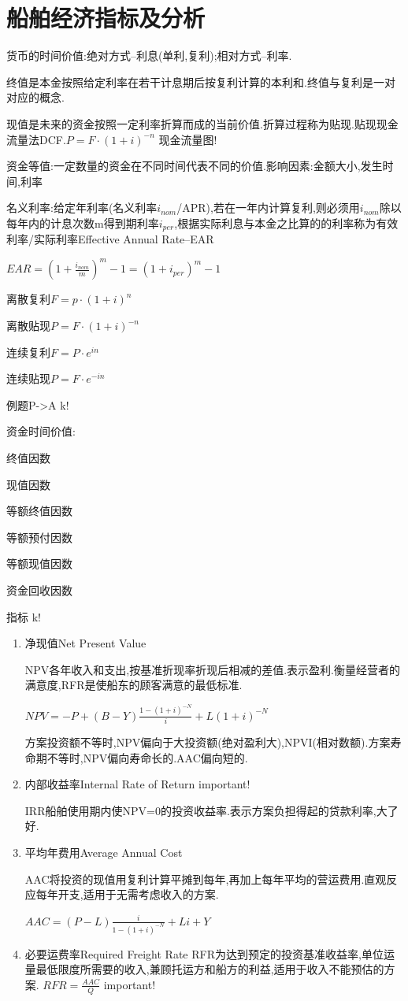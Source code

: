 \documentclass[UTF8,a4paper]{ctexart}
\begin{document}
	\section{船舶经济指标及分析}
		货币的时间价值:绝对方式--利息(单利,复利);相对方式--利率.
		
		终值是本金按照给定利率在若干计息期后按复利计算的本利和.终值与复利是一对对应的概念.
		
		现值是未来的资金按照一定利率折算而成的当前价值.折算过程称为贴现.贴现现金流量法DCF.$P=F\cdot(1+i)^{-n}$
		现金流量图!
		
		资金等值:一定数量的资金在不同时间代表不同的价值.影响因素:金额大小,发生时间,利率
		
		名义利率:给定年利率(名义利率$i_{nom}$/APR),若在一年内计算复利,则必须用$i_{nom}$除以每年内的计息次数m得到期利率$i_{per}$,根据实际利息与本金之比算的的利率称为有效利率/实际利率Effective Annual Rate--EAR
		
		$EAR=(1+\frac{i_{nom}}{m})^m-1=(1+i_{per})^m-1$
		
		离散复利$F=p\cdot(1+i)^n$
		
		离散贴现$P=F\cdot(1+i)^{-n}$
		
		连续复利$F=P\cdot e^{in}$
		
		连续贴现$P=F\cdot e^{-in}$
		
		例题P->A k!
		
		资金时间价值:
		
		终值因数
		
		现值因数
		
		等额终值因数
		
		等额预付因数
		
		等额现值因数
		
		资金回收因数
		
		
		指标 k!
		\begin{enumerate}[$\cdot$]
			\item 净现值Net Present Value
			
			NPV各年收入和支出,按基准折现率折现后相减的差值.表示盈利.衡量经营者的满意度,RFR是使船东的顾客满意的最低标准. 
			
					$NPV=-P + (B-Y)\frac{1-(1+i)^{-N}}{i}+L(1+i)^{-N}$ 
					
				方案投资额不等时,NPV偏向于大投资额(绝对盈利大),NPVI(相对数额).方案寿命期不等时,NPV偏向寿命长的.AAC偏向短的.
				
			\item 内部收益率Internal Rate of Return important!
		
			IRR船舶使用期内使NPV=0的投资收益率.表示方案负担得起的贷款利率,大了好.
			
			\item 平均年费用Average Annual Cost 
			
			AAC将投资的现值用复利计算平摊到每年,再加上每年平均的营运费用.直观反应每年开支,适用于无需考虑收入的方案.
			
				$AAC = (P-L)\frac{i}{1-(1+i)^{-N}}+Li+Y$
			
			\item 必要运费率Required Freight Rate RFR为达到预定的投资基准收益率,单位运量最低限度所需要的收入,兼顾托运方和船方的利益,适用于收入不能预估的方案.
				$RFR=\frac{AAC}{Q}$ important!
		\end{enumerate}
	
\end{document}
